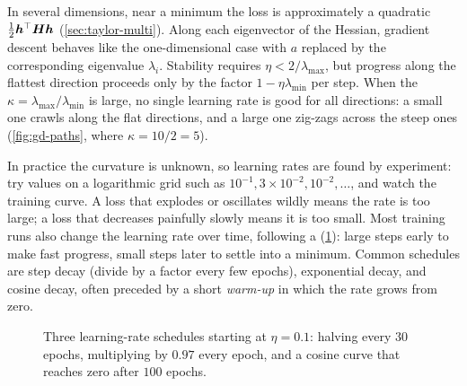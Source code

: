 In several dimensions, near a minimum the loss is approximately a quadratic
$\frac12\bm{h}^\top\bm{H}\bm{h}$ (\cref{sec:taylor-multi}). Along each eigenvector of the
Hessian, gradient descent behaves like the one-dimensional case with $a$
replaced by the corresponding eigenvalue $\lambda_i$. Stability requires
$\eta < 2/\lambda_{\max}$, but progress along the flattest direction proceeds
only by the factor $1 - \eta\lambda_{\min}$ per step. When the
 $\kappa = \lambda_{\max}/\lambda_{\min}$ is large, no
single learning rate is good for all directions: a small one crawls along the
flat directions, and a large one zig-zags across the steep ones
(\cref{fig:gd-paths}, where $\kappa = 10/2 = 5$).

\begin{mlnote}
In practice the curvature is unknown, so learning rates are found by
experiment: try values on a logarithmic grid such as $10^{-1}, 3\times10^{-2},
10^{-2}, \dots$, and watch the training curve. A loss that explodes or
oscillates wildly means the rate is too large; a loss that decreases
painfully slowly means it is too small. Most training runs also change the
learning rate over time, following a 
(\cref{fig:schedules}): large steps early to make fast progress, small steps
later to settle into a minimum. Common schedules are step decay (divide by a
factor every few epochs), exponential decay, and cosine decay, often preceded
by a short \emph{warm-up} in which the rate grows from zero.
\end{mlnote}

\begin{figure}[htbp]
\centering
{}
\caption{Three learning-rate schedules starting at $\eta = 0.1$: halving every
  $30$ epochs, multiplying by $0.97$ every epoch, and a cosine curve that reaches
  zero after $100$ epochs.}
\label{fig:schedules}
\end{figure}

